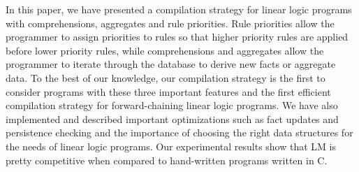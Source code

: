 In this paper, we have presented a compilation strategy for linear logic
programs with comprehensions, aggregates and rule priorities. Rule priorities
allow the programmer to assign priorities to rules so that higher priority rules
are applied before lower priority rules, while comprehensions and aggregates
allow the programmer to iterate through the database to derive new facts or
aggregate data. To the best of our knowledge, our compilation strategy is the
first to consider programs with these three important features and the first
efficient compilation strategy for forward-chaining linear logic programs.
We have also implemented and described important optimizations
such as fact updates and persistence checking and the importance of choosing the
right data structures for the needs of linear logic programs.
Our experimental results show that LM is pretty competitive when
compared to hand-written programs written in C.
